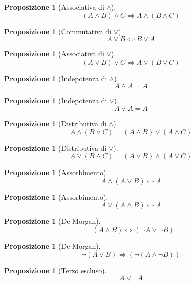 \documentclass[a4paper,12pt]{article}
\theoremstyle{mystyle}
\newtheorem{proposition}[theorem]{Proposizione}
\begin{document}
\begin{proposition}[Associativa di \(\land\)]
    \[
        (A \land B) \land C \Leftrightarrow A \land (B \land C)
    \]
\end{proposition}

\begin{proposition}[Commutativa di \(\lor\)]
    \[
        A \lor B \Leftrightarrow B \lor A
    \]
\end{proposition}

\begin{proposition}[Associativa di \(\lor\)]
    \[
        (A \lor B) \lor C \Leftrightarrow A \lor (B \lor C)
    \]
\end{proposition}

\begin{proposition}[Indepotenza di \(\land\)]
    \[
        A \land A = A
    \]
\end{proposition}

\begin{proposition}[Indepotenza di \(\lor\)]
    \[
        A \lor A = A
    \]
\end{proposition}

\begin{proposition}[Distributiva di \(\land\)]
    \[
        A \land (B \lor C) = (A \land B) \lor (A \land C)
    \]
\end{proposition}

\begin{proposition}[Distributiva di \(\lor\)]
    \[
        A \lor (B \land C) = (A \lor B) \land (A \lor C)
    \]
\end{proposition}

\begin{proposition}[Assorbimento]
    \[
        A \land (A \lor B) \Leftrightarrow A
    \]
\end{proposition}

\begin{proposition}[Assorbimento]
    \[
        A \lor (A \land B) \Leftrightarrow A
    \]
\end{proposition}

\begin{proposition}[De Morgan]
    \[
        \neg (A \land B) \Leftrightarrow (\neg A \lor \neg B)
    \]
\end{proposition}

\begin{proposition}[De Morgan]
    \[
        \neg(A \lor B) \Leftrightarrow (\neg(A \land \neg B))
    \]
\end{proposition}

\begin{proposition}[Terzo escluso]
    \[
        A \lor \neg A
    \]
\end{proposition}
\end{document}
